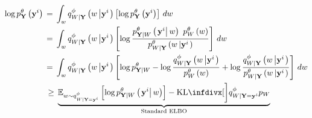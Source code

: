 \documentclass[../thesis.tex]{subfiles}
\begin{document}
\begin{equation} \label{eq:MIVAE-elbo}
\begin{split} 
    \log \myfunc{p}^{\theta}_{\mygroup{\myrv{y}}} \left( \mygroup{\myvect{y}}^i \right)
    \, &= \, 
    \int_{\myvect{w}} \myfunc{q}^{\phi}_{\myrv{w} | \mygroup{\myrv{y}}} \left( \myvect{w} \left\vert \mygroup{\myvect{y}}^i \right. \right) \left[ \log \myfunc{p}^{\theta}_{\mygroup{\myrv{y}}} \left( \mygroup{\myvect{y}}^i \right) \right] \, d \myvect{w} \\
    \, &= \, 
    \int_{\myvect{w}} 
    \myfunc{q}^{\phi}_{\myrv{w} | \mygroup{\myrv{y}}} \left( \myvect{w} \left\vert \mygroup{\myvect{y}}^i \right. \right) 
    \left[ \log \frac{\myfunc{p}^{\theta}_{\mygroup{\myrv{y}} | \myrv{w}} \left( \left. \mygroup{\myvect{y}}^i \right\vert \myvect{w} \right) ~ \myfunc{p}^{\theta}_{\myrv{w}} \left( \myvect{w}\right)}{\myfunc{p}^{\theta}_{\myrv{w} | \mygroup{\myrv{y}}} \left( \myvect{w} \left\vert \mygroup{\myvect{y}}^i \right. \right)}\right] \, d \myvect{w} \\
    \, &= \, 
    \int_{\myvect{w}} \myfunc{q}^{\phi}_{\myrv{w} | \mygroup{\myrv{y}}} \left( \myvect{w} \left\vert \mygroup{\myvect{y}}^i \right. \right) 
    \left[ \log \myfunc{p}^{\theta}_{\mygroup{\myrv{y}} | \myrv{w}} 
    - \log \frac{\myfunc{q}^{\phi}_{\myrv{w} | \mygroup{\myrv{y}}} \left( \myvect{w} \left\vert \mygroup{\myvect{y}}^i \right. \right)}{\myfunc{p}^{\theta}_{\myrv{w}} \left( \myvect{w} \right)} 
    + \log \frac{\myfunc{q}^{\phi}_{\myrv{w} | \mygroup{\myrv{y}}} \left( \myvect{w} \left\vert \mygroup{\myvect{y}}^i \right. \right)}{\myfunc{p}^{\theta}_{\myrv{w} | \mygroup{\myrv{y}}} \left( \myvect{w} \left\vert \mygroup{\myvect{y}}^i \right. \right)} \right] \, d\myvect{w} \\ 
    & \, \geq \, 
    \underbrace{\mathbb{E}_{\myvect{w} \sim \myfunc{q}^{\phi}_{\myrv{w} | \mygroup{\myrv{y}} = \mygroup{\myvect{y}}^i }} 
    \left[ \log \myfunc{p}^{\theta}_{\mygroup{\myrv{y}} | \myrv{w}} \left( \left. \mygroup{\myvect{y}}^i \right\vert \myvect{w} \right) \right]
    - 
    \kl[\bigg]{\myfunc{q}^{\phi}_{\myrv{w} | \mygroup{\myrv{y}} = \mygroup{\myvect{y}}^i}}{\myfunc{p}_{\myrv{w}}}}_{\text{Standard ELBO}}
\end{split}
\end{equation}
\end{document}
